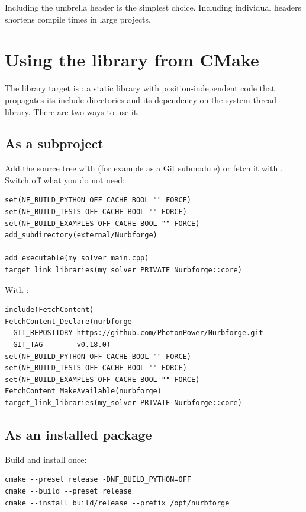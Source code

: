 Including the umbrella header is the simplest choice. Including individual headers shortens
compile times in large projects.

\section{Using the library from CMake}\label{sec:cpp-cmake}

The library target is : a static library with position-independent
code that propagates its include directories and its dependency on the system thread
library. There are two ways to use it.

\subsection{As a subproject}
Add the source tree with  (for example as a Git submodule) or fetch it
with . Switch off what you do not need:

\begin{lstlisting}[style=cmake]
set(NF_BUILD_PYTHON OFF CACHE BOOL "" FORCE)
set(NF_BUILD_TESTS OFF CACHE BOOL "" FORCE)
set(NF_BUILD_EXAMPLES OFF CACHE BOOL "" FORCE)
add_subdirectory(external/Nurbforge)

add_executable(my_solver main.cpp)
target_link_libraries(my_solver PRIVATE Nurbforge::core)
\end{lstlisting}

With :

\begin{lstlisting}[style=cmake]
include(FetchContent)
FetchContent_Declare(nurbforge
  GIT_REPOSITORY https://github.com/PhotonPower/Nurbforge.git
  GIT_TAG        v0.18.0)
set(NF_BUILD_PYTHON OFF CACHE BOOL "" FORCE)
set(NF_BUILD_TESTS OFF CACHE BOOL "" FORCE)
set(NF_BUILD_EXAMPLES OFF CACHE BOOL "" FORCE)
FetchContent_MakeAvailable(nurbforge)
target_link_libraries(my_solver PRIVATE Nurbforge::core)
\end{lstlisting}

\subsection{As an installed package}
Build and install \NF{} once:

\begin{lstlisting}[style=shell]
cmake --preset release -DNF_BUILD_PYTHON=OFF
cmake --build --preset release
cmake --install build/release --prefix /opt/nurbforge
\end{lstlisting}

